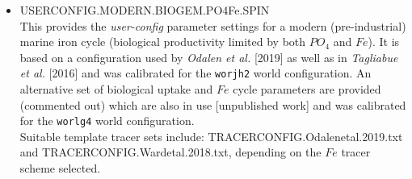 \documentclass[11pt,fleqn]{book} %
\begin{document}
\begin{itemize}[noitemsep]
\vspace{2mm}
\item \textsf{\small USERCONFIG.MODERN.BIOGEM.PO4Fe.SPIN}
\vspace{1mm}
\\This provides the \textit{user-config} parameter settings for a modern (pre-industrial) marine iron cycle (biological productivity limited by both \(PO_{4}\) and \(Fe\)). It is based on a configuration used by \textit{Odalen et al.} [2019] as well as in \textit{Tagliabue et al.} [2016] and was calibrated for the \texttt{worjh2} world configuration. An alternative set of biological uptake and \(Fe\) cycle parameters are provided (commented out) which are also in use [unpublished work] and was calibrated for the \texttt{worlg4} world configuration.
\\Suitable template tracer sets include: \textsf{\footnotesize TRACERCONFIG.Odalenetal.2019.txt} and \linebreak \textsf{\footnotesize TRACERCONFIG.Wardetal.2018.txt}, depending on the \(Fe\) tracer scheme selected.


\end{itemize}
\end{document}

